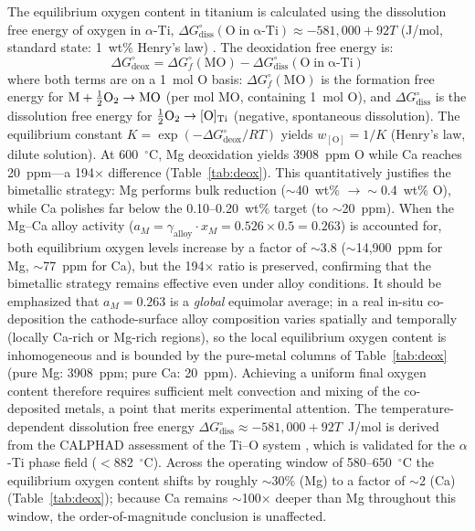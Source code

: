 \documentclass[sn-mathphys,Numbered]{sn-jnl}
\begin{document}
The equilibrium oxygen content in titanium is calculated using the dissolution free energy of oxygen in $\alpha$-Ti, $\Delta G^{\circ}_{\mathrm{diss}}(\mathrm{O\;in\;\alpha\text{-}Ti}) \approx -581{,}000 + 92T$ (J/mol, standard state: 1~wt\% Henry's law) \cite{waldner1999}. The deoxidation free energy is:
\begin{equation}
\label{eq:deox}
\Delta G^{\circ}_{\mathrm{deox}} = \Delta G^{\circ}_{f}(\mathrm{MO}) - \Delta G^{\circ}_{\mathrm{diss}}(\mathrm{O\;in\;\alpha\text{-}Ti})
\end{equation}
where both terms are on a 1~mol O basis: $\Delta G^{\circ}_{f}(\mathrm{MO})$ is the formation free energy for $\mathrm{M} + \tfrac{1}{2}\ce{O2} \to \mathrm{MO}$ (per mol MO, containing 1~mol O), and $\Delta G^{\circ}_{\mathrm{diss}}$ is the dissolution free energy for $\tfrac{1}{2}\ce{O2} \to [\mathrm{O}]_{\mathrm{Ti}}$ (negative, spontaneous dissolution). The equilibrium constant $K = \exp(-\Delta G^{\circ}_{\mathrm{deox}}/RT)$ yields $w_{[\mathrm{O}]} = 1/K$ (Henry's law, dilute solution). At 600~$^{\circ}$C, Mg deoxidation yields 3908~ppm O while Ca reaches 20~ppm---a 194$\times$ difference (Table~\ref{tab:deox}). This quantitatively justifies the bimetallic strategy: Mg performs bulk reduction ($\sim$40~wt\% $\to \sim$0.4~wt\% O), while Ca polishes far below the 0.10--0.20~wt\% target (to $\sim$20~ppm). When the Mg--Ca alloy activity ($a_M = \gamma_{\mathrm{alloy}} \cdot x_M = 0.526 \times 0.5 = 0.263$) is accounted for, both equilibrium oxygen levels increase by a factor of $\sim$3.8 ($\sim$14{,}900~ppm for Mg, $\sim$77~ppm for Ca), but the 194$\times$ ratio is preserved, confirming that the bimetallic strategy remains effective even under alloy conditions. It should be emphasized that $a_M = 0.263$ is a \emph{global} equimolar average; in a real in-situ co-deposition the cathode-surface alloy composition varies spatially and temporally (locally Ca-rich or Mg-rich regions), so the local equilibrium oxygen content is inhomogeneous and is bounded by the pure-metal columns of Table~\ref{tab:deox} (pure Mg: 3908~ppm; pure Ca: 20~ppm). Achieving a uniform final oxygen content therefore requires sufficient melt convection and mixing of the co-deposited metals, a point that merits experimental attention. The temperature-dependent dissolution free energy $\Delta G^{\circ}_{\mathrm{diss}} \approx -581{,}000 + 92T$~J/mol is derived from the CALPHAD assessment of the Ti--O system \cite{waldner1999}, which is validated for the $\alpha$-Ti phase field ($<$882~$^{\circ}$C). Across the operating window of 580--650~$^{\circ}$C the equilibrium oxygen content shifts by roughly $\sim$30\% (Mg) to a factor of $\sim$2 (Ca) (Table~\ref{tab:deox}); because Ca remains $\sim$100$\times$ deeper than Mg throughout this window, the order-of-magnitude conclusion is unaffected.
\end{document}
